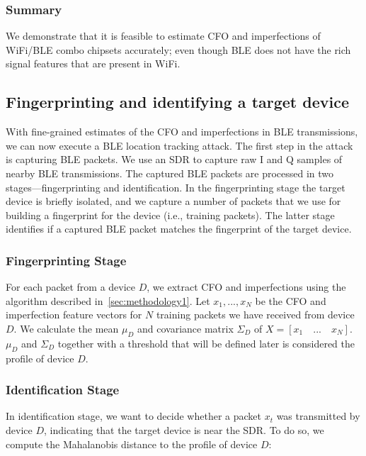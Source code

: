 \subsubsection*{Summary}

We demonstrate that it is feasible to estimate CFO and \iq
imperfections of WiFi/BLE combo chipsets accurately; even
though BLE does not have the rich signal features that are
present in WiFi.

\subsection{Fingerprinting and identifying a target device}
\label{sec:methodology2}
With fine-grained estimates of the CFO and \iq imperfections in BLE transmissions, we can now execute a BLE location tracking attack.
The first step in the attack is capturing BLE packets. We use an SDR to capture raw I and Q samples of nearby BLE transmissions. %
The captured BLE packets are processed in two stages---fingerprinting and identification. In the fingerprinting stage the target device is briefly isolated, and we capture a number of packets that we use for building a fingerprint for the device (i.e., training packets). The latter stage identifies if a captured BLE packet matches the fingerprint of the target device.

\subsubsection*{Fingerprinting Stage}
For each packet from a device $D$, we extract CFO and \iq imperfections using the algorithm described in~\ref{sec:methodology1}. Let $x_1,...,x_N$ be the CFO and \iq imperfection feature vectors for $N$ training packets we have received from device $D$. We calculate the mean $\mu_D$ and covariance matrix $\Sigma_D$ of $X = [x_1 \quad ... \quad x_N]$. $\mu_D$ and $\Sigma_D$ together with a threshold that will be defined later is considered the profile of device $D$.

\subsubsection*{Identification Stage}
In identification stage, we want to decide whether a packet $x_t$ was transmitted by device $D$, indicating that the target device is near the SDR. To do so, we compute the Mahalanobis distance to the profile of device $D$:

